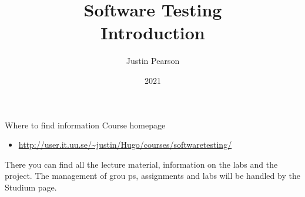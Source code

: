 \documentclass{beamer}
\title{Software Testing \\ Introduction}
\author{Justin Pearson}
\date{2021}
\begin{document}
\lstset{language=python}

\begin{frame}
  \maketitle
\end{frame}
\begin{frame}{Where to find information}
Course homepage
 \begin{itemize}
 \item \url{http://user.it.uu.se/~justin/Hugo/courses/softwaretesting/}
 \end{itemize}
 There you can find all the lecture material, information on the labs
 and the project. The management of grou
 ps, assignments and labs will
 be handled by the Studium page.  
\end{frame}
\end{document}
